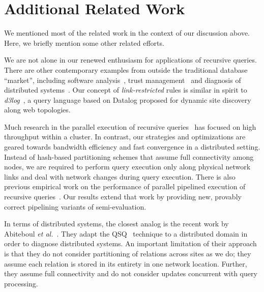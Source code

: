 

\section{Additional Related Work}
We mentioned most of the related work in the context of our discussion
above.  Here, we briefly mention some other related efforts.


We are not alone in our renewed enthusiasm for applications of
recursive queries.  There are other contemporary examples from outside the
traditional database ``market'', including software
analysis~\cite{whaley04}, trust management~\cite{Cassandra} and
diagnosis of distributed systems~\cite{discreteEventDatalog}.  Our
concept of {\em link-restricted} rules is similar in spirit to {\em
  d3log}~\cite{jimsuciu}, a query language based on Datalog proposed
for dynamic site discovery along web topologies.

Much research in the
parallel execution of recursive queries~\cite{cacace93survey} has
focused on high throughput within a cluster. In contrast, our
strategies and optimizations are geared towards bandwidth efficiency
and fast convergence in a distributed setting.  Instead of hash-based
partitioning schemes that assume full connectivity among nodes, we are
required to perform query execution only along physical network links
and deal with network changes during query execution.  There is also
previous empirical work on the performance of parallel pipelined
execution of recursive queries~\cite{pipelinedRecursive}. Our results
extend that work by providing new, provably correct pipelining
variants of semi-\naive evaluation.

In terms of distributed systems, the closest analog is the recent work
by Abiteboul \textit{et al.}~\cite{discreteEventDatalog}.  They adapt
the QSQ~\cite{qsr} technique to a distributed domain in order to
diagnose distributed systems.  An important limitation of their
approach is that they do not consider partitioning of relations across
sites as we do; they assume each relation is stored in its entirety in
one network location. Further, they assume full connectivity and do not
consider updates concurrent with query processing.



